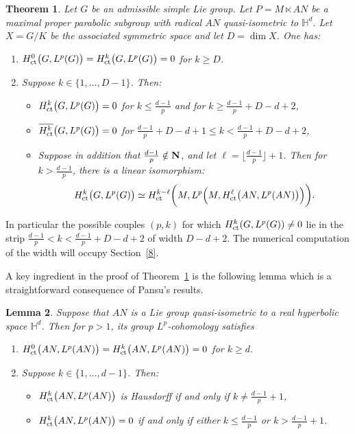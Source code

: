 \documentclass[11pt]{article}
\newtheorem{theo}{Theorem}[section]
\newtheorem{lemm}[theo]{Lemma}
\theoremstyle{definition}
\numberwithin{equation}{section}
\numberwithin{figure}{section}
\numberwithin{table}{section}
\DeclareMathOperator{\ct}{ct}
\begin{document}
\begin{theo}\label{theorem_vanishing}
Let $G$ be an admissible simple Lie group. Let $P = M \ltimes AN$ be a maximal proper parabolic subgroup with radical $AN$ quasi-isometric to $\mathbb H ^d$. Let $X = G/K$ be the associated symmetric space and let $D = \dim X$. One has:
\begin{enumerate}
\item ${\rm H}^0 _{\ct}\bigl(G, L^p(G) \bigr) = {\rm H}^k _{\ct}\bigl(G, L^p(G) \bigr) = 0$ for $k \geqslant D$.
\item Suppose $k \in \{1,\dots,D-1\}$. Then:
\begin{itemize}
\item ${\rm H}^k _{\ct}\bigl(G, L^p(G) \bigr) = 0$ for $k \leqslant \frac{d-1}{p}$ and for $k \geqslant \frac{d-1}{p} + D-d+2$,
\item $\overline{{\rm H}^k _{\ct}}\bigl(G, L^p(G) \bigr) =0$ for $\frac{d-1}{p} + D-d+1 \leqslant k < \frac{d-1}{p} + D-d+2$,
\item Suppose in addition that $\frac{d-1}{p} \notin {\bf N}$, and let $\ell = \lfloor \frac{d-1}{p} \rfloor +1$. Then for $k > \frac{d-1}{p}$, there is a linear isomorphism:
\[
{\rm H}_{\ct} ^k \bigl(G, L^p(G) \bigr) \simeq {\rm H}_{\ct} ^{k-\ell} \biggl(M, L^p\Bigl(M, {\rm H}^\ell _{\ct} \bigl(AN, L^p(AN)\bigr)\Bigr)\biggr).
\]
\end{itemize}
\end{enumerate}
\end{theo}

In particular the possible couples $(p,k)$ for which ${\rm H}^k _{\ct}(G, L^p(G)) \neq 0$ lie in the strip $\frac{d-1}{p} < k <\frac{d-1}{p} + D-d+2$ of width $D-d+2$. The numerical computation of the width will occupy Section~\ref{8}.

A key ingredient in the proof of Theorem~\ref{theorem_vanishing} is the following lemma which is a straightforward consequence of Pansu's results.

\begin{lemm}\label{prop_SL}
Suppose that $AN$ is a Lie group quasi-isometric to a real hyperbolic space $\mathbb H ^d$.
Then for $p>1$, its group $L^p$-cohomology satisfies
\begin{enumerate}
\item ${\rm H}^0 _{\ct} \bigl(AN, L^p(AN) \bigr) = {\rm H}^k _{\ct} \bigl(AN, L^p(AN)\bigr) = 0$ for $k \geqslant d$.
\item Suppose $k \in \{1,\dots,d-1\}$. Then:
\begin{itemize}
\item ${\rm H}^k _{\ct} \bigl(AN, L^p(AN)\bigr)$ is Hausdorff if and only if $k \neq \frac{d-1}{p} +1$,
\item ${\rm H}^k _{\ct} \bigl(AN, L^p(AN)\bigr) = 0$ if and only if either $k \leqslant \frac{d-1}{p}$ or $k > \frac{d-1}{p} + 1$.
\end{itemize}
\end{enumerate}
\end{lemm}
\end{document}
